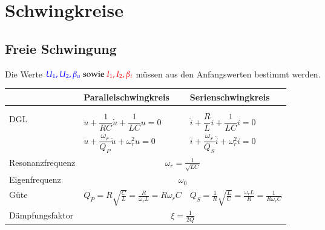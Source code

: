 \section{Schwingkreise}
\subsection{Freie Schwingung}
Die Werte $\textcolor{blue}{U_1,U_2,\beta_u}\text{ sowie
}\textcolor{red}{I_1,I_2,\beta_i}$ müssen aus den Anfangswerten bestimmt
werden.\\
\renewcommand{\arraystretch}{2}
\begin{tabular}{| p{4cm} | p{7cm} | p{7cm} |}
	\hline
		& \textbf{Parallelschwingkreis} 
		& \textbf{Serienschwingkreis} \\
	\hline
	& & \\
	& 
	& \\
	\hline	
	DGL &
  $\ddot{u} + \dfrac{1}{RC} \dot{u} + \dfrac{1}{LC} u = 0$
  & $\ddot{i} + \dfrac{R}{L} \dot{i} + \dfrac{1}{LC} i = 0$\\
  & $\ddot{u} + \dfrac{\omega_r}{Q_P} \dot{u} + \omega_r^2 u = 0$
  & $\ddot{i} + \dfrac{\omega_r}{Q_S} \dot{i} + \omega_r^2 i = 0$\\
	\hline
	Resonanzfrequenz & \multicolumn{2}{|c|}{$\omega_r =
	\frac{1}{\sqrt{LC}}$} \\
	\hline
	Eigenfrequenz & \multicolumn{2}{|c|}{$\omega_0$} \\
	\hline
	Güte & 
	$Q_P = R\sqrt{\frac{C}{L}} = \frac{R}{\omega_r L}=R\omega_rC$ &
	$Q_S = \frac{1}{R}\sqrt{\frac{L}{C}} = \frac{\omega_r
	L}{R}=\frac{1}{R\omega_rC}$\\
	\hline
	Dämpfungsfaktor & \multicolumn{2}{|c|}{$\xi=\frac{1}{2Q}$} \\
	\hline
	

\end{tabular}
